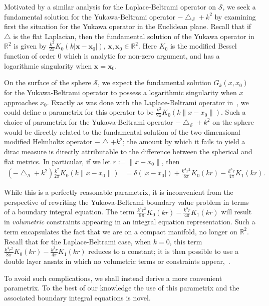 \documentclass[final]{siamltex}
\newcommand{\lap}{\bigtriangleup}
\renewcommand{\S} {\mathcal{S}}
\begin{document}
Motivated by a similar analysis for the Laplace-Beltrami operator on
$\S$, we seek a fundamental solution for the Yukawa-Beltrami operator
$-\lap_\S + k^2$ by examining first the situation for the Yukawa
operator in the Euclidean plane. Recall that if $\lap$ is the flat
Laplacian, then the fundamental solution of the Yukawa operator in
$\mathbb{R}^2$ is given by $\frac{k^2}{2\pi}
K_{0}(k|\mathbf{x}-\mathbf{x}_{0}|)$, $\mathbf{x},\mathbf{x}_{0} \in
\mathbb{R}^{2}$. Here $K_{0}$ is the modified Bessel function of order 0
which is analytic for non-zero argument, and has a logarithmic
singularity when $\mathbf{x}=\mathbf{x}_{0}$. 

On the surface of the sphere $\S$, we expect the fundamental solution
$G_k(x,x_{0})$ for the Yukawa-Beltrami operator to possess a
logarithmic singularity when $x$ approaches $x_{0}$. Exactly as was
done  with the Laplace-Beltrami operator in~\cite{gemmrich}, we could
define a parametrix for this operator to be $
\frac{k^2}{2\pi}K_0(k\|x-x_{0}\|)$.  Such a choice of parametrix for
the Yukawa-Beltrami operator $-\lap_{\S}+k^2$ on the sphere would be
directly related to the fundamental solution of the two-dimensional
modified Helmholtz operator $-\lap+k^2$; the amount by which it fails
to yield a dirac measure is directly attributable to the difference
between the spherical and flat metrics.  In particular, if we let
$r:=\|x-x_{0}\|$, then
\begin{align*}
  (-\lap_{\S} + k^{2})\frac{k^2}{2\pi}K_0(k\|x-x_{0}\|)&=
    \delta(|x-x_{0}|) 
    +\frac{k^{4}r^{2}}{8\pi}K_{0}(kr) - \frac{k^{3}r}{4\pi}K_{1}(kr).
\end{align*}

While this is a perfectly reasonable parametrix, it is inconvenient from
the perspective of rewriting the Yukawa-Beltrami boundary value problem
in terms of a boundary integral equation. The term $\frac{k^{4}r^{2}}{8\pi}K_{0}(kr) - \frac{k^{3}r}{4\pi}K_{1}(kr)$ will result
in {\it volumetric} constraints  appearing in an integral equation
representation. Such a term encapsulates the fact that we are on a
compact manifold, no longer on $\mathbb{R}^2$. Recall that for the
Laplace-Beltrami case, when $k=0$, this term $\frac{k^{4}r^{2}}{8\pi}K_{0}(kr) - \frac{k^{3}r}{4\pi}K_{1}(kr)$ reduces to a
constant; it is then possible to use a double layer ansatz in which no
volumetric terms or constraints appear,~\cite{kro:nig2013}.  

To avoid
such complications, we shall instead derive a more convenient
parametrix. To the best of our knowledge the use of this parametrix and
the associated boundary integral equations is novel. 
\end{document}
